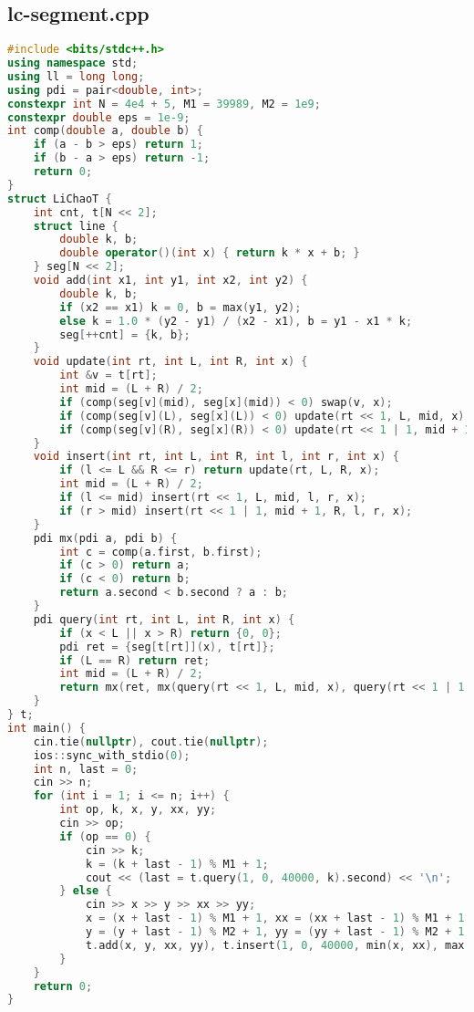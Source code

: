 \documentclass[9pt, a4paper, oneside]{book}
\begin{document}
\subsection{lc-segment.cpp}
\begin{lstlisting}[language={C++}]
#include <bits/stdc++.h>
using namespace std;
using ll = long long;
using pdi = pair<double, int>;
constexpr int N = 4e4 + 5, M1 = 39989, M2 = 1e9;
constexpr double eps = 1e-9;
int comp(double a, double b) {
    if (a - b > eps) return 1;
    if (b - a > eps) return -1;
    return 0;
}
struct LiChaoT {
    int cnt, t[N << 2];
    struct line {
        double k, b;
        double operator()(int x) { return k * x + b; }
    } seg[N << 2];
    void add(int x1, int y1, int x2, int y2) {
        double k, b;
        if (x2 == x1) k = 0, b = max(y1, y2);
        else k = 1.0 * (y2 - y1) / (x2 - x1), b = y1 - x1 * k;
        seg[++cnt] = {k, b};
    }
    void update(int rt, int L, int R, int x) {
        int &v = t[rt];
        int mid = (L + R) / 2;
        if (comp(seg[v](mid), seg[x](mid)) < 0) swap(v, x);
        if (comp(seg[v](L), seg[x](L)) < 0) update(rt << 1, L, mid, x);
        if (comp(seg[v](R), seg[x](R)) < 0) update(rt << 1 | 1, mid + 1, R, x);
    }
    void insert(int rt, int L, int R, int l, int r, int x) {
        if (l <= L && R <= r) return update(rt, L, R, x);
        int mid = (L + R) / 2;
        if (l <= mid) insert(rt << 1, L, mid, l, r, x);
        if (r > mid) insert(rt << 1 | 1, mid + 1, R, l, r, x);
    }
    pdi mx(pdi a, pdi b) {
        int c = comp(a.first, b.first);
        if (c > 0) return a;
        if (c < 0) return b;
        return a.second < b.second ? a : b;
    }
    pdi query(int rt, int L, int R, int x) {
        if (x < L || x > R) return {0, 0};
        pdi ret = {seg[t[rt]](x), t[rt]};
        if (L == R) return ret;
        int mid = (L + R) / 2;
        return mx(ret, mx(query(rt << 1, L, mid, x), query(rt << 1 | 1, mid + 1, R, x)));
    }
} t;
int main() {
    cin.tie(nullptr), cout.tie(nullptr);
    ios::sync_with_stdio(0);
    int n, last = 0;
    cin >> n;
    for (int i = 1; i <= n; i++) {
        int op, k, x, y, xx, yy;
        cin >> op;
        if (op == 0) {
            cin >> k;
            k = (k + last - 1) % M1 + 1;
            cout << (last = t.query(1, 0, 40000, k).second) << '\n';
        } else {
            cin >> x >> y >> xx >> yy;
            x = (x + last - 1) % M1 + 1, xx = (xx + last - 1) % M1 + 1;
            y = (y + last - 1) % M2 + 1, yy = (yy + last - 1) % M2 + 1;
            t.add(x, y, xx, yy), t.insert(1, 0, 40000, min(x, xx), max(x, xx), t.cnt);
        }
    }
    return 0;
}\end{lstlisting}
\end{document}
